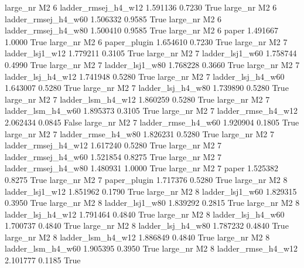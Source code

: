   large_nr       M2                 6 ladder_rmsej_h4_w12   1.591136      0.7230    True
  large_nr       M2                 6 ladder_rmsej_h4_w60   1.506332      0.9585    True
  large_nr       M2                 6 ladder_rmsej_h4_w80   1.500410      0.9585    True
  large_nr       M2                 6               paper   1.491667      1.0000    True
  large_nr       M2                 6        paper_plugin   1.654610      0.7230    True
  large_nr       M2                 7     ladder_lsj1_w12   1.779211      0.3105    True
  large_nr       M2                 7     ladder_lsj1_w60   1.758744      0.4990    True
  large_nr       M2                 7     ladder_lsj1_w80   1.768228      0.3660    True
  large_nr       M2                 7   ladder_lsj_h4_w12   1.741948      0.5280    True
  large_nr       M2                 7   ladder_lsj_h4_w60   1.643007      0.5280    True
  large_nr       M2                 7   ladder_lsj_h4_w80   1.739890      0.5280    True
  large_nr       M2                 7   ladder_lsm_h4_w12   1.860259      0.5280    True
  large_nr       M2                 7   ladder_lsm_h4_w60   1.895373      0.3105    True
  large_nr       M2                 7  ladder_rmse_h4_w12   2.062434      0.0845   False
  large_nr       M2                 7  ladder_rmse_h4_w60   1.920904      0.1805    True
  large_nr       M2                 7  ladder_rmse_h4_w80   1.826231      0.5280    True
  large_nr       M2                 7 ladder_rmsej_h4_w12   1.617240      0.5280    True
  large_nr       M2                 7 ladder_rmsej_h4_w60   1.521854      0.8275    True
  large_nr       M2                 7 ladder_rmsej_h4_w80   1.480931      1.0000    True
  large_nr       M2                 7               paper   1.525382      0.8275    True
  large_nr       M2                 7        paper_plugin   1.717376      0.5280    True
  large_nr       M2                 8     ladder_lsj1_w12   1.851962      0.1790    True
  large_nr       M2                 8     ladder_lsj1_w60   1.829315      0.3950    True
  large_nr       M2                 8     ladder_lsj1_w80   1.839292      0.2815    True
  large_nr       M2                 8   ladder_lsj_h4_w12   1.791464      0.4840    True
  large_nr       M2                 8   ladder_lsj_h4_w60   1.700737      0.4840    True
  large_nr       M2                 8   ladder_lsj_h4_w80   1.787232      0.4840    True
  large_nr       M2                 8   ladder_lsm_h4_w12   1.886849      0.4840    True
  large_nr       M2                 8   ladder_lsm_h4_w60   1.905395      0.3950    True
  large_nr       M2                 8  ladder_rmse_h4_w12   2.101777      0.1185    True
